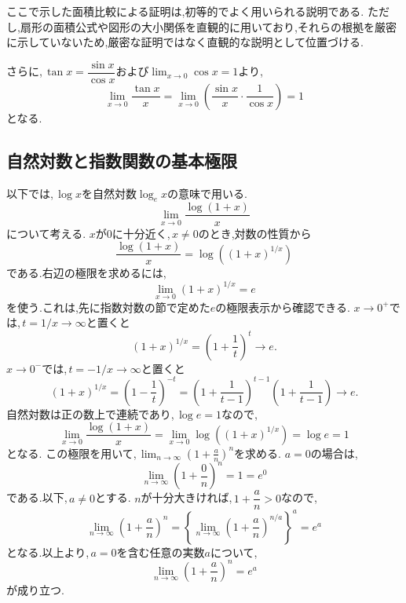     ここで示した面積比較による証明は,初等的でよく用いられる説明である.
    ただし,扇形の面積公式や図形の大小関係を直観的に用いており,それらの根拠を厳密に示していないため,厳密な証明ではなく直観的な説明として位置づける.

    さらに,\,$\tan x=\dfrac{\sin x}{\cos x}$および$\lim_{x\to0}\cos x=1$より,
    \[
      \lim_{x\to0}\frac{\tan x}{x}
      =
      \lim_{x\to0}
      \left(
        \frac{\sin x}{x}\cdot\frac{1}{\cos x}
      \right)
      =1
    \]
    となる.

  \subsection{自然対数と指数関数の基本極限}\label{節：自然対数と指数関数の基本極限}
    以下では,\,$\log x$を自然対数$\log_e x$の意味で用いる.
    \[
      \lim_{x\to0}\frac{\log(1+x)}{x}
    \]
    について考える.
    $x$が$0$に十分近く,\,$x\ne0$のとき,対数の性質から
    \[
      \frac{\log(1+x)}{x}
      =\log\left((1+x)^{1/x}\right)
    \]
    である.右辺の極限を求めるには,
    \[
      \lim_{x\to0}(1+x)^{1/x}=e
    \]
    を使う.これは,先に指数対数の節で定めた$e$の極限表示から確認できる.
    $x\to0^+$では,\,$t=1/x\to\infty$と置くと
    \[
      (1+x)^{1/x}=\left(1+\frac1t\right)^t\longrightarrow e.
    \]
    $x\to0^-$では,\,$t=-1/x\to\infty$と置くと
    \[
      (1+x)^{1/x}
      =\left(1-\frac1t\right)^{-t}
      =\left(1+\frac1{t-1}\right)^{t-1}
       \left(1+\frac1{t-1}\right)
      \longrightarrow e.
    \]
    自然対数は正の数上で連続であり,\,$\log e=1$なので,
    \[
      \lim_{x\to0}\frac{\log(1+x)}{x}
      =\lim_{x\to0}\log\left((1+x)^{1/x}\right)
      =\log e=1
    \]
    となる.
    この極限を用いて,\,$\lim_{n\to\infty}\left(1+\frac{a}{n}\right)^n$を求める.
    $a=0$の場合は,
    \[
      \lim_{n\to\infty}\left(1+\frac{0}{n}\right)^n=1=e^0
    \]
    である.以下,\,$a\ne0$とする.
    $n$が十分大きければ,\,$1+\dfrac{a}{n}>0$なので,
    \[
      \lim_{n\to\infty}\left(1+\frac{a}{n}\right)^n
      =
      \left\{
        \lim_{n\to\infty}
        \left(1+\frac{a}{n}\right)^{n/a}
      \right\}^{a}
      =e^a
    \]
    となる.以上より,\,$a=0$を含む任意の実数$a$について,
    \[
      \lim_{n\to\infty}\left(1+\frac{a}{n}\right)^n=e^a
    \]
    が成り立つ.
